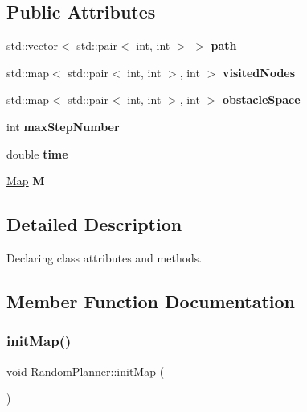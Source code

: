 \subsection*{Public Attributes}
\begin{DoxyCompactItemize}
\item 
\mbox{\label{classRandomPlanner_a407276fa42d3dcb31e114e561964f44b}} 
std\+::vector$<$ std\+::pair$<$ int, int $>$ $>$ {\bfseries path}
\item 
\mbox{\label{classRandomPlanner_af14ce51b7e457a6b4fbdbc4137f32d92}} 
std\+::map$<$ std\+::pair$<$ int, int $>$, int $>$ {\bfseries visited\+Nodes}
\item 
\mbox{\label{classRandomPlanner_a9f0f6606426bd079c46c0e7a5fb85a93}} 
std\+::map$<$ std\+::pair$<$ int, int $>$, int $>$ {\bfseries obstacle\+Space}
\item 
\mbox{\label{classRandomPlanner_ab87ab9d683da04a4fda77eceb68fe7c4}} 
int {\bfseries max\+Step\+Number}
\item 
\mbox{\label{classRandomPlanner_affba6befaecd7066a93433429a70c4e9}} 
double {\bfseries time}
\item 
\mbox{\label{classRandomPlanner_a7d4dea739f1b4019df9c6e9dea08fe62}} 
\mbox{\hyperlink{classMap}{Map}} {\bfseries M}
\end{DoxyCompactItemize}


\subsection{Detailed Description}
Declaring class attributes and methods. 

\subsection{Member Function Documentation}
\mbox{\label{classRandomPlanner_ac912ac25d980a4ca2686fa954fed9669}} 
\subsubsection{\texorpdfstring{init\+Map()}{initMap()}}
{\footnotesize\ttfamily void Random\+Planner\+::init\+Map (\begin{DoxyParamCaption}{ }\end{DoxyParamCaption})}




